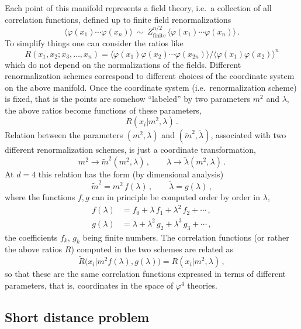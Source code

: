 Each point of this manifold represents a field theory, i.e.\ a collection of all
correlation functions, defined up to finite field renormalizations
\[
\bigl\langle\varphi(x_1)\cdots\varphi(x_n)\bigr\rangle\ \sim\ Z_{\text{finite}}^{n/2}\,\bigl\langle\varphi(x_1)\cdots\varphi(x_n)\bigr\rangle\,.
\]
To simplify things one can consider the ratios like
\[
R(x_1,x_2;x_3,\dots,x_n)=\bigl\langle\varphi(x_1)\varphi(x_2)\cdots\varphi(x_{2n})\bigr\rangle\big/\bigl\langle\varphi(x_1)\varphi(x_2)\bigr\rangle^n
\]
which do not depend on the normalizations of the fields. Different
renormalization schemes correspond to different choices of the coordinate system
on the above manifold. Once the coordinate system (i.e.\ renormalization scheme)
is fixed, that is the points are somehow ``labeled'' by two parameters $m^2$ and
$\lambda$, the above ratios become functions of these parameters,
\[
R(x_i|m^2,\lambda)\,.
\]
Relation between the parameters $(m^2,\lambda)$ and $(\tilde m^2,\tilde\lambda)$,
associated with two different renormalization schemes, is just a coordinate
transformation,
\[
m^2\to\tilde m^2(m^2,\lambda)\,,\qquad\lambda\to\tilde\lambda(m^2,\lambda)\,.
\]
At $d=4$ this relation has the form (by dimensional analysis)
\begin{equation}\label{eq:schemechange}
\tilde m^2=m^2\,f(\lambda)\,,\qquad\tilde\lambda=g(\lambda)\,,
\end{equation}
where the functions $f,g$ can in principle be computed order by order in
$\lambda$,
\begin{align*}
f(\lambda)&=f_0+\lambda\,f_1+\lambda^2\,f_2+\cdots\,,\\
g(\lambda)&=\lambda+\lambda^2\,g_2+\lambda^3\,g_3+\cdots\,,
\end{align*}
the coefficients $f_k$, $g_k$ being finite numbers. The correlation functions
(or rather the above ratios $R$) computed in the two schemes are related as
\[
\tilde R\bigl(x_i|m^2f(\lambda),g(\lambda)\bigr)=R(x_i|m^2,\lambda)\,,
\]
so that these are the same correlation functions expressed in terms of different
parameters, that is, coordinates in the space of $\varphi^4$ theories.

\subsection*{Short distance problem}

